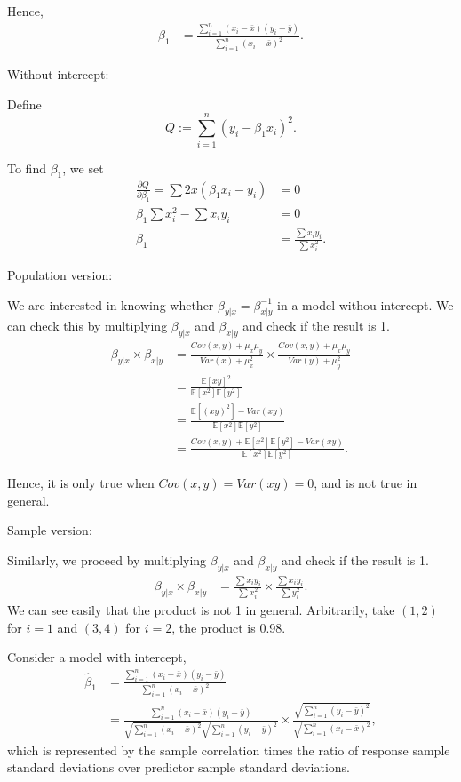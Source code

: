 \documentclass{article}
\begin{document}
Hence, 
\begin{align*}
    \beta_1 & = \frac{\sum_{i=1}^n(x_i-\bar{x})(y_i-\bar{y})}{\sum_{i=1}^n(x_i-\bar{x})^2}.
\end{align*}

Without intercept:

Define $$Q:=\sum_{i=1}^n(y_i-\beta_1x_i)^2.$$

To find $\beta_1$, we set
\begin{align*}
    \frac{\partial Q}{\partial \beta_1} = \sum 2x(\beta_1x_i-y_i) & = 0 \\
    \beta_1\sum x_i^2 - \sum x_iy_i & = 0 \\
    \beta_1 & = \frac{\sum x_iy_i}{\sum x_i^2}.
\end{align*}

Population version:

We are interested in knowing whether $\beta_{y|x} = \beta_{x|y}^{-1}$ in a model withou intercept.
We can check this by multiplying $\beta_{y|x}$ and $\beta_{x|y}$ and check if the result is 1.
\begin{align*}
    \beta_{y|x} \times \beta_{x|y} & = \frac{Cov(x,y)+\mu_x\mu_y}{Var(x)+\mu_x^2} 
    \times \frac{Cov(x,y)+\mu_x\mu_y}{Var(y)+\mu_y^2} \\
    & = \frac{\mathbb{E}\left[xy\right]^2}{\mathbb{E}\left[x^2\right]\mathbb{E}\left[y^2\right]} \\
    & = \frac{\mathbb{E}\left[(xy)^2\right]-Var(xy)}{\mathbb{E}\left[x^2\right]\mathbb{E}\left[y^2\right]} \\
    & = \frac{Cov(x,y)+\mathbb{E}\left[x^2\right]\mathbb{E}\left[y^2\right]-Var(xy)}{\mathbb{E}\left[x^2\right]\mathbb{E}\left[y^2\right]}.
\end{align*}

Hence, it is only true when $Cov(x,y)=Var(xy)=0$, and is not true in general.

Sample version:

Similarly, we proceed by multiplying $\beta_{y|x}$ and $\beta_{x|y}$ and check if the result is 1.
\begin{align*}
    \beta_{y|x} \times \beta_{x|y} & = \frac{\sum x_iy_i}{\sum x_i^2} \times \frac{\sum x_iy_i}{\sum y_i^2}.
\end{align*}
We can see easily that the product is not 1 in general. Arbitrarily, take $(1,2)$ for $i=1$ and 
$(3,4)$ for $i=2$, the product is 0.98.


Consider a model with intercept, 
\begin{align*}
    \hat{\beta}_1 & = \frac{\sum_{i=1}^n(x_i-\bar{x})(y_i-\bar{y})}{\sum_{i=1}^n(x_i-\bar{x})^2} \\
    & = \frac{\sum_{i=1}^n(x_i-\bar{x})(y_i-\bar{y})}{\sqrt{\sum_{i=1}^n(x_i-\bar{x})^2}\sqrt{\sum_{i=1}^{n}(y_i-\bar{y})^2}}\times 
    \frac{\sqrt{\sum_{i=1}^{n}(y_i-\bar{y})^2}}{\sqrt{\sum_{i=1}^{n}(x_i-\bar{x})^2}},
\end{align*}
which is represented by the sample correlation times the ratio of response sample standard 
deviations over predictor sample standard deviations.
\end{document}
